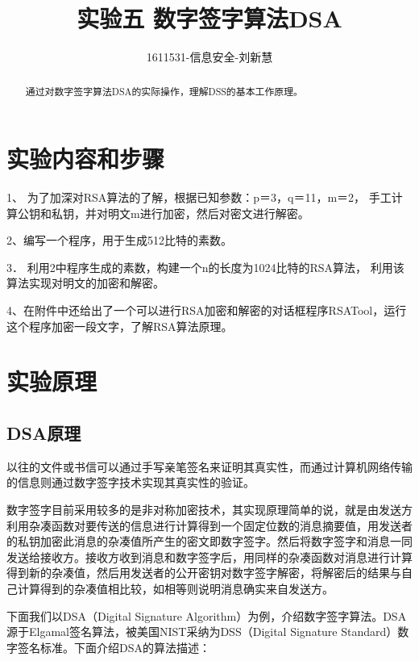 \documentclass[UTF8,a4paper]{article}
\title{实验五 数字签字算法DSA}
\author{1611531-信息安全-刘新慧}
\date{}
\begin{document}
\maketitle

\begin{abstract}
通过对数字签字算法DSA的实际操作，理解DSS的基本工作原理。\par 
\end{abstract}
\tableofcontents
\newpage
	\section{实验内容和步骤}
1、	为了加深对RSA算法的了解，根据已知参数：p＝3，q＝11，m＝2，
手工计算公钥和私钥，并对明文m进行加密，然后对密文进行解密。\par 
2、编写一个程序，用于生成512比特的素数。\par 
3．	利用2中程序生成的素数，构建一个n的长度为1024比特的RSA算法，
利用该算法实现对明文的加密和解密。\par 
4、在附件中还给出了一个可以进行RSA加密和解密的对话框程序RSATool，运行这个程序加密一段文字，了解RSA算法原理。\par 

	\section{实验原理}
	\subsection{DSA原理}
以往的文件或书信可以通过手写亲笔签名来证明其真实性，而通过计算机网络传输的信息则通过数字签字技术实现其真实性的验证。\par 
数字签字目前采用较多的是非对称加密技术，其实现原理简单的说，就是由发送方利用杂凑函数对要传送的信息进行计算得到一个固定位数的消息摘要值，用发送者的私钥加密此消息的杂凑值所产生的密文即数字签字。然后将数字签字和消息一同发送给接收方。接收方收到消息和数字签字后，用同样的杂凑函数对消息进行计算得到新的杂凑值，然后用发送者的公开密钥对数字签字解密，将解密后的结果与自己计算得到的杂凑值相比较，如相等则说明消息确实来自发送方。\par 
下面我们以DSA（Digital Signature Algorithm）为例，介绍数字签字算法。DSA源于Elgamal签名算法，被美国NIST采纳为DSS（Digital Signature Standard）数字签名标准。下面介绍DSA的算法描述：\par 
\end{document}
